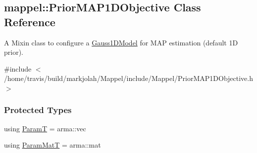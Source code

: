 \hypertarget{classmappel_1_1PriorMAP1DObjective}{}\subsection{mappel\+:\+:Prior\+M\+A\+P1\+D\+Objective Class Reference}
\label{classmappel_1_1PriorMAP1DObjective}


A Mixin class to configure a \hyperlink{classmappel_1_1Gauss1DModel}{Gauss1\+D\+Model} for M\+AP estimation (default 1D prior).  




{\ttfamily \#include $<$/home/travis/build/markjolah/\+Mappel/include/\+Mappel/\+Prior\+M\+A\+P1\+D\+Objective.\+h$>$}

\subsubsection*{Protected Types}
\begin{DoxyCompactItemize}
\item 
using \hyperlink{classmappel_1_1PriorMAP1DObjective_a7be5932169c2c7c9d55a89cc20bbce20}{ParamT} = arma\+::vec
\item 
using \hyperlink{classmappel_1_1PriorMAP1DObjective_a6bd7c5f78d8bd65ed513003a7289d92f}{Param\+MatT} = arma\+::mat
\end{DoxyCompactItemize}
